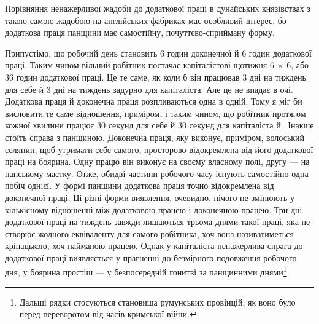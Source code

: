 Порівняння ненажерливої жадоби до додаткової праці в дунайських
князівствах з такою самою жадобою на англійських
фабриках має особливий інтерес, бо додаткова праця панщини
має самостійну, почуттєво-сприйману форму.

Припустімо, що робочий день становить 6 годин доконечної
й 6 годин додаткової праці. Таким чином вільний робітник
постачає капіталістові щотижня 6 × 6, або 36 годин додаткової
праці. Це те саме, як коли б він працював 3 дні на тиждень для
себе й 3 дні на тиждень задурно для капіталіста. Але це не впадає
в очі. Додаткова праця й доконечна праця розпливаються одна
в одній. Тому я міг би висловити те саме відношення, приміром,
і таким чином, що робітник протягом кожної хвилини працює
30 секунд для себе й 30 секунд для капіталіста й~ Інакше
стоїть справа з панщиною. Доконечна праця, яку виконує, приміром,
волоський селянин, щоб утримати себе самого, просторово
відокремлена від його додаткової праці на боярина. Одну працю
він виконує на своєму власному полі, другу — на панському
маєтку. Отже, обидві частини робочого часу існують самостійно
одна побіч однієї. У формі панщини додаткова праця точно відокремлена
від доконечної праці. Ці різні форми виявлення, очевидно,
нічого не змінюють у кількісному відношенні між додатковою
працею і доконечною працею. Три дні додаткової праці на
тиждень завжди лишаються трьома днями такої праці, яка не
створює жодного еквіваленту для самого робітника, хоч вона
називатиметься кріпацькою, хоч найманою працею. Однак у
капіталіста ненажерлива спрага до додаткової праці виявляється
у прагненні до безмірного подовження робочого дня, у боярина
простіш — у безпосередній гонитві за панщинними днями\footnote{
Дальші рядки стосуються становища румунських провінцій, як
воно було перед переворотом від часів кримської війни.
}.

